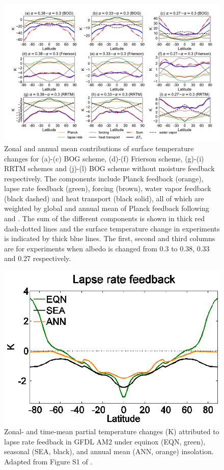 

\begin{figure}[tbhp]
	\centering
	\includegraphics[width=1.0\linewidth]{figs/polar_amp/delta_ts_decomp}
	\caption{Zonal and annual mean contributions of surface temperature changes for (a)-(c) BOG scheme, (d)-(f) Frierson scheme, (g)-(i) RRTM schemes and (j)-(l) BOG scheme without moisture feedback respectively. The components include Planck feedback (orange), lapse rate feedback (green), forcing (brown), water vapor feedback (black dashed) and heat transport (black solid), all of which are weighted by global and annual mean of Planck feedback following \cite{Feldl2013a} and \cite{Kim2018}. The sum of the different components is shown in thick red dash-dotted lines and the surface temperature change in experiments is indicated by thick blue lines. The first, second and third columns are for experiments when albedo is changed from 0.3 to 0.38, 0.33 and 0.27 respectively.}
	\label{fig:delta_ts_decomp} 
\end{figure}


\begin{figure}[tbhp] %
	\centering
	\includegraphics[width=.6\linewidth]{figs/polar_amp/Kim2018_lapserate}
	\caption{Zonal- and time-mean partial temperature changes (K) attributed to lapse rate feedback in GFDL AM2 under equinox (EQN, green), seasonal (SEA, black), and annual mean (ANN, orange) insolation. Adapted from Figure S1 of \cite{Kim2018}.}
	\label{fig:kim2018_lapserate}
\end{figure}

